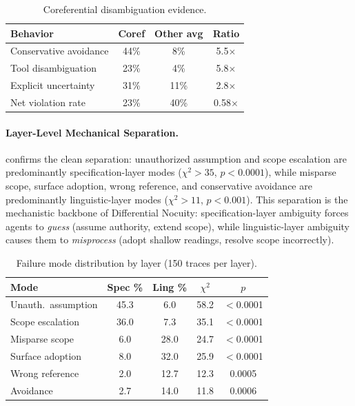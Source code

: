 \documentclass[11pt]{article}
\begin{document}
\begin{table}[t]
\centering
\small
\caption{Coreferential disambiguation evidence.}
\label{tab:coref_evidence}
\begin{tabular}{lccc}
\toprule
\textbf{Behavior} & \textbf{Coref} & \textbf{Other avg} & \textbf{Ratio} \\
\midrule
Conservative avoidance & 44\% & 8\% & 5.5$\times$ \\
Tool disambiguation & 23\% & 4\% & 5.8$\times$ \\
Explicit uncertainty & 31\% & 11\% & 2.8$\times$ \\
Net violation rate & 23\% & 40\% & 0.58$\times$ \\
\bottomrule
\end{tabular}
\end{table}

\paragraph{Layer-Level Mechanical Separation.}
 confirms the clean separation: unauthorized assumption and scope escalation are predominantly specification-layer modes ($\chi^2>35$, $p<0.0001$), while misparse scope, surface adoption, wrong reference, and conservative avoidance are predominantly linguistic-layer modes ($\chi^2>11$, $p<0.001$). This separation is the mechanistic backbone of Differential Nocuity: specification-layer ambiguity forces agents to \emph{guess} (assume authority, extend scope), while linguistic-layer ambiguity causes them to \emph{misprocess} (adopt shallow readings, resolve scope incorrectly).

\begin{table}[t]
\centering
\small
\caption{Failure mode distribution by layer (150 traces per layer).}
\label{tab:layer_modes}
\begin{tabular}{lcccc}
\toprule
\textbf{Mode} & \textbf{Spec \%} & \textbf{Ling \%} & \textbf{$\chi^2$} & \textbf{$p$} \\
\midrule
Unauth.\ assumption & 45.3 & 6.0 & 58.2 & $<$0.0001 \\
Scope escalation & 36.0 & 7.3 & 35.1 & $<$0.0001 \\
Misparse scope & 6.0 & 28.0 & 24.7 & $<$0.0001 \\
Surface adoption & 8.0 & 32.0 & 25.9 & $<$0.0001 \\
Wrong reference & 2.0 & 12.7 & 12.3 & 0.0005 \\
Avoidance & 2.7 & 14.0 & 11.8 & 0.0006 \\
\bottomrule
\end{tabular}
\end{table}
\end{document}
